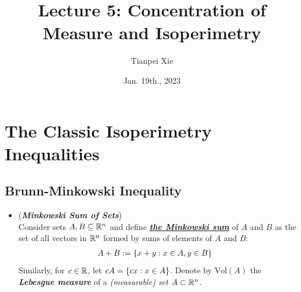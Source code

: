 \documentclass[11pt]{article}
\begin{document}
\title{Lecture 5: Concentration of Measure and Isoperimetry}
\author{ Tianpei Xie}
\date{Jan. 19th., 2023 }
\maketitle
\tableofcontents
\newpage
\section{The Classic Isoperimetry Inequalities}
\subsection{Brunn-Minkowski Inequality}
\begin{itemize}
\item \begin{definition} (\textbf{\emph{Minkowski Sum of Sets}})\\
Consider sets $A, B \subseteq {\mathbb R}^n$ and define \underline{\emph{\textbf{the Minkowski sum}}} of $A$ and $B$ as the set of all vectors in ${\mathbb R}^n$ formed by sums of elements of $A$ and $B$:
\begin{align*}
A + B &:= \left\{x+y: x \in A, y \in B\right\}
\end{align*} 
Similarly, for $c \in {\mathbb R}$, let $c A = \left\{cx : x \in A\right\}$. Denote by $\text{Vol}(A)$ the \emph{\textbf{Lebesgue measure}} of a \emph{(measurable) set $A \subset {\mathbb R}^n$}.
\end{definition}



\end{itemize}
\end{document}
